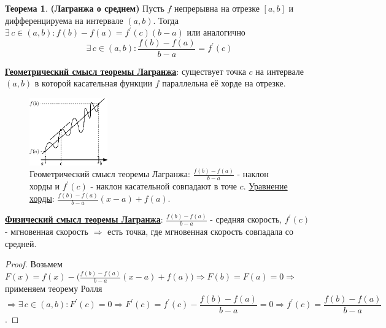 \documentclass[12pt]{article}
\theoremstyle{definition}
\newtheorem{theorem}{Теорема}
\begin{document}
\begin{theorem}\textbf{(Лагранжа о среднем)}
	Пусть $f$ непрерывна на отрезке $[a,b]$ и дифференцируема на интервале $(a,b)$. Тогда $\exists \, c \in (a,b) \colon f(b) - f(a) = f^\prime(c)(b-a)$ или аналогично
	$$\exists \, c \in (a,b) \colon \dfrac{f(b) - f(a)}{b-a} = f^\prime(c)$$
\end{theorem}
\uline{\textbf{Геометрический смысл теоремы Лагранжа}}: существует точка $c$ на интервале $(a,b)$ в которой касательная функции $f$ параллельна её хорде на отрезке.
\begin{figure}[H]
	\centering
	\includegraphics[width=0.3\textwidth]{23_4.eps}
	\caption{Геометрический смысл теоремы Лагранжа: $\tfrac{f(b) - f(a)}{b-a}$ - наклон хорды и $f^\prime(c)$ - наклон касательной совпадают в точе $c$. \uline{Уравнение хорды}: $\tfrac{f(b)-f(a)}{b-a}(x-a) + f(a)$.}
	\label{23_4}
\end{figure}
\uline{\textbf{Физический смысл теоремы Лагранжа}}: $\tfrac{f(b) - f(a)}{b-a}$ - средняя скорость, $f^\prime(c)$ - мгновенная скорость $\Rightarrow$ есть точка, где мгновенная скорость совпадала со средней.
\begin{proof}
	Возьмем $F(x) = f(x) - \Big(\tfrac{f(b)-f(a)}{b-a}(x-a) + f(a) \Big ) \Rightarrow F(b) = F(a) = 0 \Rightarrow$ применяем теорему Ролля $\Rightarrow \exists \, c \in(a,b) \colon F^\prime(c) = 0 \Rightarrow F^\prime(c) = f^\prime(c) - \dfrac{f(b)-f(a)}{b-a} = 0 \Rightarrow f^\prime(c) = \dfrac{f(b)-f(a)}{b-a}$.
\end{proof}
\end{document}
